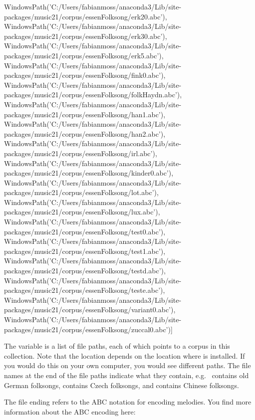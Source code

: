 \documentclass[letterpaper,10pt,english]{sphinxmanual}
\begin{document}
{\begin{sphinxVerbatim}[commandchars=\\\{\}]
 WindowsPath('C:/Users/fabianmoss/anaconda3/Lib/site-packages/music21/corpus/essenFolksong/erk20.abc'),
 WindowsPath('C:/Users/fabianmoss/anaconda3/Lib/site-packages/music21/corpus/essenFolksong/erk30.abc'),
 WindowsPath('C:/Users/fabianmoss/anaconda3/Lib/site-packages/music21/corpus/essenFolksong/erk5.abc'),
 WindowsPath('C:/Users/fabianmoss/anaconda3/Lib/site-packages/music21/corpus/essenFolksong/fink0.abc'),
 WindowsPath('C:/Users/fabianmoss/anaconda3/Lib/site-packages/music21/corpus/essenFolksong/folkHaydn.abc'),
 WindowsPath('C:/Users/fabianmoss/anaconda3/Lib/site-packages/music21/corpus/essenFolksong/han1.abc'),
 WindowsPath('C:/Users/fabianmoss/anaconda3/Lib/site-packages/music21/corpus/essenFolksong/han2.abc'),
 WindowsPath('C:/Users/fabianmoss/anaconda3/Lib/site-packages/music21/corpus/essenFolksong/irl.abc'),
 WindowsPath('C:/Users/fabianmoss/anaconda3/Lib/site-packages/music21/corpus/essenFolksong/kinder0.abc'),
 WindowsPath('C:/Users/fabianmoss/anaconda3/Lib/site-packages/music21/corpus/essenFolksong/lot.abc'),
 WindowsPath('C:/Users/fabianmoss/anaconda3/Lib/site-packages/music21/corpus/essenFolksong/lux.abc'),
 WindowsPath('C:/Users/fabianmoss/anaconda3/Lib/site-packages/music21/corpus/essenFolksong/test0.abc'),
 WindowsPath('C:/Users/fabianmoss/anaconda3/Lib/site-packages/music21/corpus/essenFolksong/test1.abc'),
 WindowsPath('C:/Users/fabianmoss/anaconda3/Lib/site-packages/music21/corpus/essenFolksong/testd.abc'),
 WindowsPath('C:/Users/fabianmoss/anaconda3/Lib/site-packages/music21/corpus/essenFolksong/teste.abc'),
 WindowsPath('C:/Users/fabianmoss/anaconda3/Lib/site-packages/music21/corpus/essenFolksong/variant0.abc'),
 WindowsPath('C:/Users/fabianmoss/anaconda3/Lib/site-packages/music21/corpus/essenFolksong/zuccal0.abc')]
\end{sphinxVerbatim}
}

The variable  is a list of file paths, each of which points to a corpus in this collection. Note that the location depends on the location where  is installed. If you would do this on your own computer, you would see different paths. The file names at the end of the file paths indicate what they contain, e.g.  contains old German folksongs,  contains Czech folksongs, and  contains Chinese folksongs.

The  file ending refers to the ABC notation for encoding melodies. You find more information about the ABC encoding here: 
\end{document}

